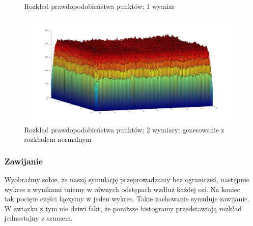 \documentclass{mini}
\begin{document}
\begin{figure}[H]
\centering
{}
\quad
{}
\caption{Rozkład prawdopodobieństwa punktów; 1 wymiar}
\end{figure}

\begin{figure}[H]
\centering
\includegraphics[width=\textwidth]{s_n_10M_2__20_20__10_10_4_2}
\caption{Rozkład prawdopodobieństwa punktów; 2 wymiary; generowanie z rozkładem normalnym}
\end{figure}

\subsubsection*{Zawijanie}
Wyobraźmy sobie, że naszą symulację przeprowadzamy bez ograniczeń, następnie wykres z wynikami tniemy w równych odstępach wzdłuż każdej osi. Na koniec tak pocięte części łączymy w jeden wykres. Takie zachowanie symuluje zawijanie. W związku z tym nie dziwi fakt, że poniższe histogramy przedstawiają rozkład jednostajny z szumem.
\end{document}

